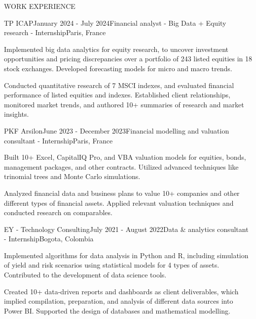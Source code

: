 \documentclass{resume} %
\begin{document}
\begin{rSection}{WORK EXPERIENCE}

    \begin{rSubsection}{TP ICAP}{January 2024 - July 2024}{Financial analyst - Big Data + Equity research - Internship}{Paris, France}
        \item Implemented big data analytics for equity research, to uncover investment opportunities and pricing discrepancies over a portfolio of 243 listed equities in 18 stock exchanges. Developed forecasting models for micro and macro trends.
        \item Conducted quantitative research of 7 MSCI indexes, and evaluated financial performance of listed equities and indexes. Established client relationships, monitored market trends, and authored 10+ summaries of research and market insights.
    \end{rSubsection}
    
    \begin{rSubsection}{PKF Arsilon}{June 2023 - December 2023}{Financial modelling and valuation consultant - Internship}{Paris, France}
        \item Built 10+ Excel, CapitalIQ Pro, and VBA valuation models for equities, bonds, management packages, and other contracts. Utilized advanced techniques like trinomial trees and Monte Carlo simulations.
        \item Analyzed financial data and business plans to value 10+ companies and other different types of financial assets. Applied relevant valuation techniques and conducted research on comparables. %
    \end{rSubsection}
    
    \begin{rSubsection}{EY - Technology Consulting}{July 2021 - August 2022}{Data \& analytics consultant - Internship}{Bogota, Colombia}
        \item Implemented algorithms for data analysis in Python and R, including simulation of yield and risk scenarios using statistical models for 4 types of assets. Contributed to the development of data science tools.
        \item Created 10+ data-driven reports and dashboards as client deliverables, which implied compilation, preparation, and analysis of different data sources into Power BI. Supported the design of databases and mathematical modelling.
    \end{rSubsection}
    \end{rSection}
\end{document}
